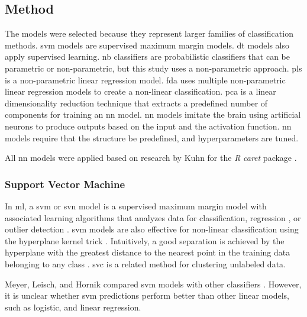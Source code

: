 \documentclass[sn-mathphys-num]{sn-jnl}%
\begin{document}
\subsection{Method}

The models were selected because they represent larger families of classification methods. \acrshort{svm} models are supervised maximum margin models. \acrshort{dt} models also apply supervised learning. \acrshort{nb} classifiers are probabilistic classifiers that can be parametric or non-parametric, but this study uses a non-parametric approach. \acrshort{pls} is a non-parametric linear regression model. \acrshort{fda} uses multiple non-parametric linear regression models to create a non-linear classification. \acrshort{pca} is a linear dimensionality reduction technique that extracts a predefined number of components for training an \acrshort{nn} model. \acrshort{nn} models imitate the brain using artificial neurons to produce outputs based on the input and the activation function. \acrshort{nn} models require that the structure be predefined, and hyperparameters are tuned.

All \acrshort{nn} models were applied based on research by Kuhn for the \textit{R} \textit{caret} package \cite{kuhn2013applied, KuhnCaret2024, rprojectProjectStatistical}.

\subsubsection{Support Vector Machine}

In \acrlong{ml}, a \acrfull{svm} or \acrfull{svn} model is a supervised maximum margin model with associated learning algorithms that analyzes data for classification, regression \cite{Cortes1995}, or outlier detection \cite{scikit-learn2023}. \acrshort{svm} models are also effective for non-linear classification using the hyperplane kernel trick \cite{Boser1992, Aizerman1964}. Intuitively, a good separation is achieved by the hyperplane with the greatest distance to the nearest point in the training data belonging to any class \cite{HastieRosset2009}. \acrfull{svc} \cite{BenHur2001} is a related method for clustering unlabeled data.

Meyer, Leisch, and Hornik compared \acrshort{svm} models with other classifiers \cite{Meyer2003}. However, it is unclear whether \acrshort{svm} predictions perform better than other linear models, such as logistic, and linear regression.
\end{document}
